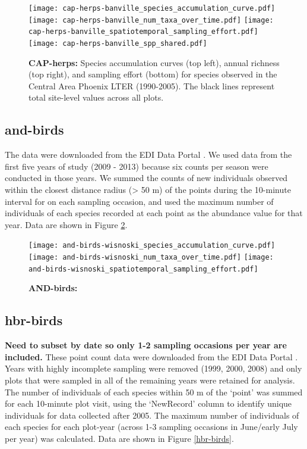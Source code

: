\documentclass[11pt, oneside]{article}
\begin{document}
\begin{figure}[h!]
\centering
\texttt{[image: cap-herps-banville\_species\_accumulation\_curve.pdf]}
\texttt{[image: cap-herps-banville\_num\_taxa\_over\_time.pdf]}
\texttt{[image: cap-herps-banville\_spatiotemporal\_sampling\_effort.pdf]}
\texttt{[image: cap-herps-banville\_spp\_shared.pdf]}
\caption{{\bf CAP-herps:} Species accumulation curves (top left),  annual richness (top right), and sampling effort (bottom)  for species observed in the Central Area Phoenix LTER (1990-2005). The black lines represent total site-level values across all plots.}
\label{cap-herps}
\end{figure}


\subsection {and-birds}
The data were downloaded from the EDI Data Portal \citep{and-birds}.
We used data from the first five years of study (2009 - 2013) because six counts per season were conducted in those years.
We summed the counts of new individuals observed within the closest distance radius (> 50 m)  of the points during the 10-minute interval for on each sampling occasion, and used the maximum number of individuals of each species recorded at each point as the abundance value for that year.
Data are shown in Figure \ref{and-birds}.

\begin{figure}[h!]
\centering
\texttt{[image: and-birds-wisnoski\_species\_accumulation\_curve.pdf]}
\texttt{[image: and-birds-wisnoski\_num\_taxa\_over\_time.pdf]}
\texttt{[image: and-birds-wisnoski\_spatiotemporal\_sampling\_effort.pdf]}
\caption{{\bf AND-birds:} }
\label{and-birds}
\end{figure}


\subsection {hbr-birds}
{\bf Need to subset by date so only 1-2 sampling occasions per year are included.}
These point count data were downloaded from the EDI Data Portal \citep{hbr-birds}.
Years with highly incomplete sampling were removed (1999, 2000, 2008) and only plots that were sampled in all of the remaining years were retained for analysis.
The number of individuals of each species within 50 m of the `point' was summed for each 10-minute plot visit, using the `NewRecord' column to identify unique individuals for data collected after 2005. 
The maximum number of individuals of each species for each plot-year (across 1-3 sampling occasions in June/early July per year)  was calculated.
Data are shown in Figure \ref{hbr-birds}.
\end{document}

